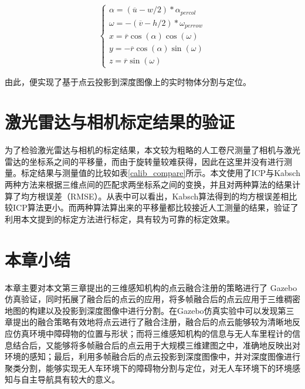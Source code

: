 \begin{equation}
    \begin{cases}
        \alpha = (\overline{u} - w / 2) * \alpha_{percol} \\
        \omega = -(\overline{v} - h / 2) * \omega_{perrow} \\
        x = \overline{r}\cos(\alpha)\cos(\omega) \\
        y = -\overline{r}\cos(\alpha)\sin(\omega) \\
        z = \overline{r}\sin(\omega)
    \end{cases}
\end{equation}


由此，便实现了基于点云投影到深度图像上的实时物体分割与定位。

\section{激光雷达与相机标定结果的验证}

为了检验激光雷达与相机的标定结果，本文较为粗略的人工卷尺测量了相机与激光雷达的坐标系之间的平移量，而由于旋转量较难获得，因此在这里并没有进行测量。标定结果与测量值的比较如表\ref{calib_compare}所示。本文使用了ICP与Kabsch两种方法来根据三维点间的匹配求两坐标系之间的变换，并且对两种算法的结果计算了均方根误差（RMSE）。从表中可以看出，Kabsch算法得到的均方根误差相比较ICP算法更小。而两种算法算出来的平移量都比较接近人工测量的结果，验证了利用本文提到的标定方法进行标定，具有较为可靠的标定效果。

\section{本章小结}

本章主要对本文第三章提出的三维感知机构的点云融合注册的策略进行了 Gazebo 仿真验证，同时拓展了融合后的点云的应用，将多帧融合后的点云应用于三维稠密地图的构建以及投影到深度图像中进行分割。在Gazebo仿真实验中可以发现第三章提出的融合策略有效地将点云进行了融合注册，融合后的点云能够较为清晰地反应仿真环境中障碍物的位置与形状；而将三维感知机构的信息与无人车里程计的信息结合后，又能够将多帧融合后的点云用于大规模三维建图之中，准确地反映出对环境的感知；最后，利用多帧融合后的点云投影到深度图像中，并对深度图像进行聚类分割，能够实现无人车环境下的障碍物分割与定位，对无人车环境下的环境感知与自主导航具有较大的意义。